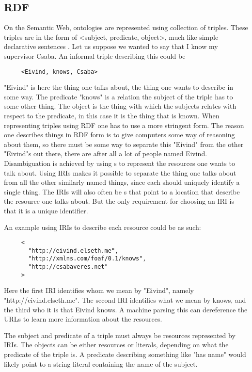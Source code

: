 \subsection{RDF}
On the Semantic Web, ontologies are represented using collection of  triples.
These triples are in the form of <subject, predicate, object>, much like simple declarative sentences \citep{Berners-Lee2001}.
Let us suppose we wanted to say that I know my supervisor Csaba.
An informal triple describing this could be
\begin{verbatim}
     <Eivind, knows, Csaba>
\end{verbatim}
"Eivind" is here the thing one talks about, the thing one wants to describe in some way.
The predicate "knows" is a relation the subject of the triple has to some other thing.
The object is the thing with which the subjects relates with respect to the predicate, in this case it is the thing that is known.
When representing triples using RDF one has to use a more stringent form.
The reason one describes things in RDF form is to give computers some way of reasoning about them,
so there must be some way to separate this "Eivind" from the other "Eivind"s out there,
there are after all a lot of people named Eivind.
Disambiguation is achieved by using s to represent the resources one wants to talk about.
Using IRIs makes it possible to separate the thing one talks about from all the other similarly named things,
since each should uniquely identify a single thing.
The IRIs will also often be s
that point to a location that describe the resource one talks about.
But the only requirement for choosing an IRI is that it is a unique identifier.

An example using IRIs to describe each resource could be as such:
\begin{verbatim}
     <
       "http://eivind.elseth.me",
       "http://xmlns.com/foaf/0.1/knows",
       "http://csabaveres.net"
     >
\end{verbatim}
Here the first IRI identifies whom we mean by "Eivind", namely "http://eivind.elseth.me".
The second IRI identifies what we mean by knows, and the third who it is that Eivind knows.
A machine parsing this can dereference the URLs to learn more information about the resources.

The subject and predicate of a triple must always be resources represented by IRIs.
The objects can be either resources or literals, depending on what the predicate of the triple is.
A predicate describing something like "has name" would likely point to a string literal containing the name of the subject\citep{Hebeler2009Chp3}.

